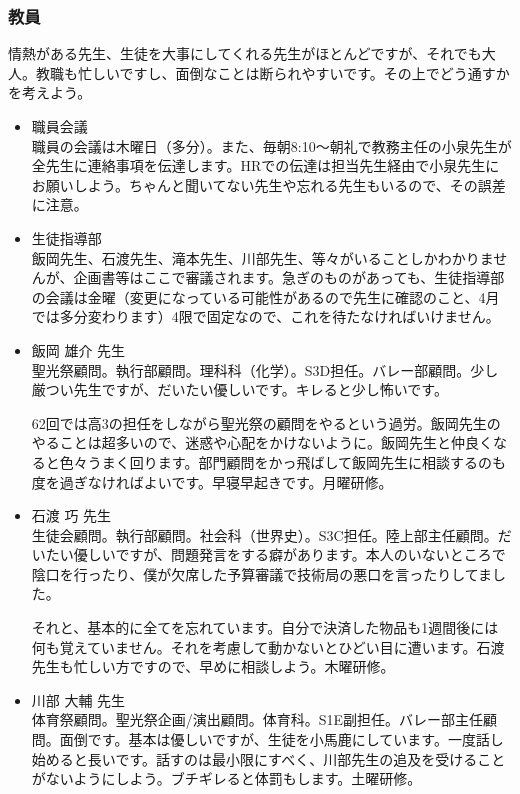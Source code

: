 \documentclass[dvipdfmx,jb5]{jarticle}
\begin{document}
\subsubsection{教員}
情熱がある先生、生徒を大事にしてくれる先生がほとんどですが、それでも大人。教職も忙しいですし、面倒なことは断られやすいです。その上でどう通すかを考えよう。
\begin{itemize}
  \item 職員会議\\
  職員の会議は木曜日（多分）。また、毎朝8:10〜朝礼で教務主任の小泉先生が全先生に連絡事項を伝達します。HRでの伝達は担当先生経由で小泉先生にお願いしよう。ちゃんと聞いてない先生や忘れる先生もいるので、その誤差に注意。

  \item 生徒指導部\\
  飯岡先生、石渡先生、滝本先生、川部先生、等々がいることしかわかりませんが、企画書等はここで審議されます。急ぎのものがあっても、生徒指導部の会議は金曜（変更になっている可能性があるので先生に確認のこと、4月では多分変わります）4限で固定なので、これを待たなければいけません。

  \item 飯岡 雄介 先生\\
  聖光祭顧問。執行部顧問。理科科（化学）。S3D担任。バレー部顧問。少し厳つい先生ですが、だいたい優しいです。キレると少し怖いです。

  62回では高3の担任をしながら聖光祭の顧問をやるという過労。飯岡先生のやることは超多いので、迷惑や心配をかけないように。飯岡先生と仲良くなると色々うまく回ります。部門顧問をかっ飛ばして飯岡先生に相談するのも度を過ぎなければよいです。早寝早起きです。月曜研修。

  \item 石渡 巧 先生\\
  生徒会顧問。執行部顧問。社会科（世界史）。S3C担任。陸上部主任顧問。だいたい優しいですが、問題発言をする癖があります。本人のいないところで陰口を行ったり、僕が欠席した予算審議で技術局の悪口を言ったりしてました。

  それと、基本的に全てを忘れています。自分で決済した物品も1週間後には何も覚えていません。それを考慮して動かないとひどい目に遭います。石渡先生も忙しい方ですので、早めに相談しよう。木曜研修。

  \item 川部 大輔 先生\\
  体育祭顧問。聖光祭企画/演出顧問。体育科。S1E副担任。バレー部主任顧問。面倒です。基本は優しいですが、生徒を小馬鹿にしています。一度話し始めると長いです。話すのは最小限にすべく、川部先生の追及を受けることがないようにしよう。ブチギレると体罰もします。土曜研修。


\end{itemize}
\end{document}
